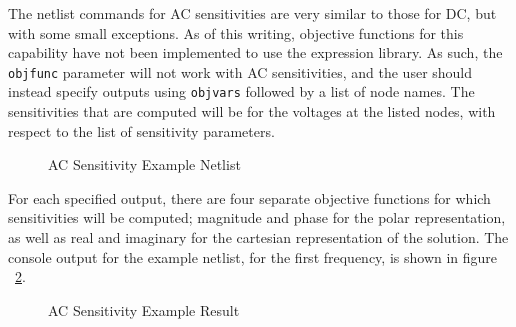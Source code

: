 The netlist commands for AC sensitivities are very similar to those
for DC, but with some small exceptions.   As of this writing, objective 
functions for this capability have not been implemented to use the 
expression library.  As such, the
\texttt{objfunc} parameter will not work with AC sensitivities, and
the user should instead specify outputs using \texttt{objvars}
followed by a list of node names.  The sensitivities that are computed
will be for the voltages at the listed nodes, with respect to the list
of sensitivity parameters.
\begin{figure}[htbp]
  \begin{centering}
\caption[AC Sensitivity Example Netlist]
{AC Sensitivity Example Netlist \label{AC_Sensitivity_Netlist} }
\end{centering}
\end{figure}
For each specified output, there are four separate objective functions
for which sensitivities will be computed; magnitude and phase for the
polar representation, as well as real and imaginary for the cartesian
representation of the solution.  The console output for the example
netlist, for the first frequency, is shown in figure
~\ref{AC_Sensitivity_Result}.
\begin{figure}[htbp]
  \begin{centering}
\caption[AC Sensitivity Example Result]
{AC Sensitivity Example Result\label{AC_Sensitivity_Result} }
\end{centering}
\end{figure}

